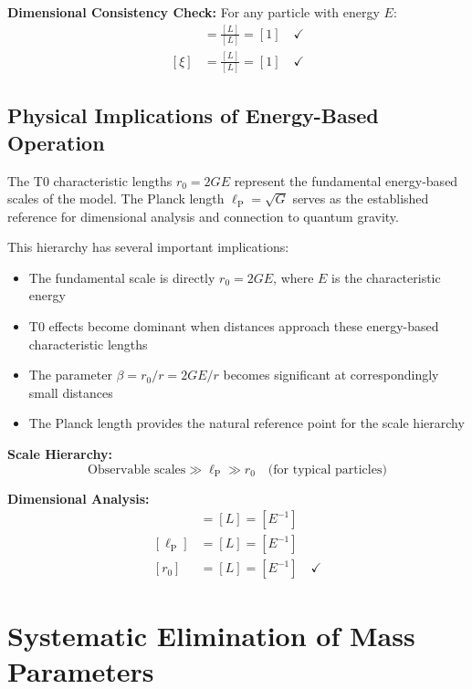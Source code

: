 \documentclass[12pt,a4paper]{report}
\newcommand{\lP}{\ell_{\text{P}}}         %
\newcommand{\rzero}{r_0}                  %
\begin{document}
	\textbf{Dimensional Consistency Check:}
	For any particle with energy $E$:
	\begin{align}
		[\rzero/\lP] &= \frac{[L]}{[L]} = [1] \quad \checkmark \\
		[\xi] &= \frac{[L]}{[L]} = [1] \quad \checkmark
	\end{align}
	
	\subsection{Physical Implications of Energy-Based Operation}\label{subsec:energy_based_implications}
	
	The T0 characteristic lengths $\rzero = 2GE$ represent the fundamental energy-based scales of the model. The Planck length $\lP = \sqrt{G}$ serves as the established reference for dimensional analysis and connection to quantum gravity.
	
	This hierarchy has several important implications:
	\begin{itemize}
		\item The fundamental scale is directly $\rzero = 2GE$, where $E$ is the characteristic energy
		\item T0 effects become dominant when distances approach these energy-based characteristic lengths
		\item The parameter $\beta = \rzero/r = 2GE/r$ becomes significant at correspondingly small distances
		\item The Planck length provides the natural reference point for the scale hierarchy
	\end{itemize}
	
	\textbf{Scale Hierarchy:}
	\begin{equation}
		\text{Observable scales} \gg \lP \gg \rzero \quad \text{(for typical particles)}
	\end{equation}
	
	\textbf{Dimensional Analysis:}
	\begin{align}
		[\text{Observable scales}] &= [L] = [E^{-1}] \\
		[\lP] &= [L] = [E^{-1}] \\
		[\rzero] &= [L] = [E^{-1}] \quad \checkmark
	\end{align}
	
	\section{Systematic Elimination of Mass Parameters}\label{sec:mass_elimination}
	
\end{document}
